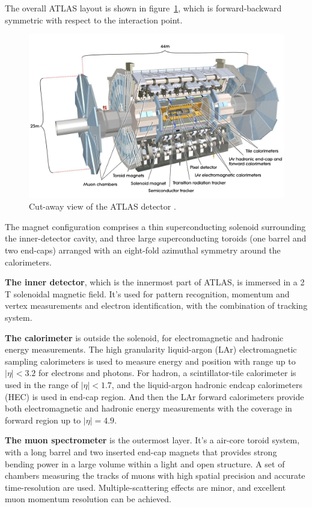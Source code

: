 The overall ATLAS layout is shown in figure~\ref{fig:atlas_layout}, which is forward-backward symmetric with respect to the interaction point.
\begin{figure}[!htb]
  \centering
  \includegraphics[width=1.0\textwidth]{figures/Detector/atlas_layout.jpg}
  \caption{Cut-away view of the ATLAS detector \cite{Pequenao:1095924}.}
  \label{fig:atlas_layout}
\end{figure}
The magnet configuration comprises a thin superconducting solenoid surrounding the inner-detector cavity, 
and three large superconducting toroids (one barrel and two end-caps) arranged with an eight-fold azimuthal symmetry around the calorimeters.

\textbf{The inner detector}, which is the innermost part of ATLAS, is immersed in a 2 T solenoidal magnetic field.
It's used for pattern recognition, momentum and vertex measurements and electron identification, with the combination of tracking system.

\textbf{The calorimeter} is outside the solenoid, for electromagnetic and hadronic energy measurements.
The high granularity liquid-argon (LAr) electromagnetic sampling calorimeters is used to measure energy and position with range up to $|\eta| < 3.2$ for electrons and photons.
For hadron, a scintillator-tile calorimeter is used in the range of $|\eta| < 1.7$, and the liquid-argon hadronic endcap calorimeters (HEC) is used in end-cap region.
And then the LAr forward calorimeters provide both electromagnetic and hadronic energy measurements with the coverage in forward region up to $|\eta| = 4.9$.

\textbf{The muon spectrometer} is the outermost layer.
It's a air-core toroid system, with a long barrel and two inserted end-cap magnets that provides strong bending power in a large volume within a light and open structure.
A set of chambers measuring the tracks of muons with high spatial precision and accurate time-resolution are used.
Multiple-scattering effects are minor, and excellent muon momentum resolution can be achieved.
